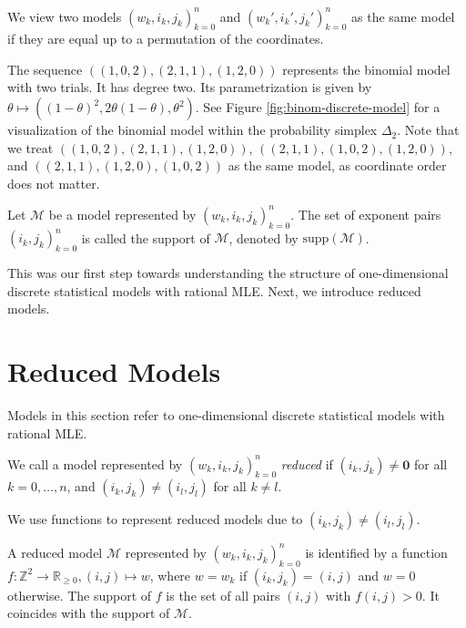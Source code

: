 \begin{remark}\label{rem:equivalent-models}
    We view two models \( (w_k,i_k,j_k)_{k=0}^n \) and \( (w_k',i_k',j_k')_{k=0}^n \) as the same model if they are equal up to a permutation of the coordinates.
\end{remark}

\begin{example}
    The sequence \( ((1,0,2), (2,1,1), (1,2,0)) \) represents the binomial model with two trials. It has degree two. Its parametrization is given by \( \theta \mapsto ((1-\theta)^2, 2\theta(1-\theta),\theta^2) \). See Figure \ref{fig:binom-discrete-model} for a visualization of the binomial model within the probability simplex \( \Delta_2 \). Note that we treat \( ((1,0,2), (2,1,1), (1,2,0)) \), \( ((2,1,1), (1,0,2), (1,2,0)) \), and \( ((2,1,1), (1,2,0), (1,0,2)) \) as the same model, as coordinate order does not matter.
\end{example}

\begin{definition}
    Let \( \mathcal{M} \) be a model represented by \( (w_k, i_k, j_k)_{k=0}^n \). The set of exponent pairs \( (i_k, j_k)_{k=0}^n \) is called the support of \( \mathcal{M} \), denoted by \( \mathrm{supp}(\mathcal{M}) \).
\end{definition}

This was our first step towards understanding the structure of one-dimensional discrete statistical models with rational MLE. Next, we introduce reduced models.

\section{Reduced Models}

Models in this section refer to one-dimensional discrete statistical models with rational MLE.

\begin{definition}
    We call a model represented by \( (w_k, i_k, j_k)_{k=0}^n \) \emph{reduced} if \( (i_k, j_k) \neq \mathbf 0 \) for all \( k = 0, \dots, n \), and \( (i_k, j_k) \neq (i_l, j_l) \) for all \( k \neq l \).
\end{definition}

We use functions to represent reduced models due to \( (i_k, j_k) \neq (i_l, j_l) \).

\begin{remark}\label{rem:representation-of-models-by-functions}
    A reduced model \( \mathcal{M} \) represented by \( (w_k, i_k, j_k)_{k=0}^n \) is identified by a function \( f: \mathbb{Z}^2 \to \mathbb{R}_{\geq 0}, (i, j) \mapsto w \), where \( w = w_k \) if \( (i_k, j_k) = (i, j) \) and \( w = 0 \) otherwise. The support of \( f \) is the set of all pairs \( (i, j) \) with \( f(i, j) > 0 \). It coincides with the support of \( \mathcal{M} \).
\end{remark}


